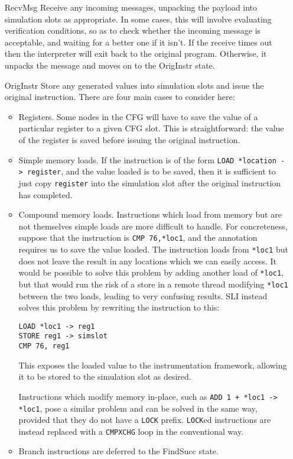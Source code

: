 \documentclass[12pt,a4paper]{book}
\begin{document}
\begin{itemize}
\item[RecvMsg]
  Receive any incoming messages, unpacking the payload into simulation slots as appropriate.
  In some cases, this will involve evaluating verification conditions, so as to check whether the incoming message is acceptable, and waiting for a better one if it isn't.
  If the receive times out then the interpreter will exit back to the original program.
  Otherwise, it unpacks the message and moves on to the OrigInstr state.
\item[OrigInstr]
  Store any generated values into simulation slots and issue the original instruction.
  There are four main cases to consider here:

  \begin{itemize}
  \item
    Registers.
    Some nodes in the CFG will have to save the value of a particular register to a given CFG slot.
    This is straightforward: the value of the register is saved before issuing the original instruction.
  \item
    Simple memory loads.
    If the instruction is of the form \verb|LOAD *location -> register|, and the value loaded is to be saved, then it is sufficient to just copy \verb|register| into the simulation slot after the original instruction has completed.
  \item
    Compound memory loads.
    Instructions which load from memory but are not themselves simple loads are more difficult to handle.
    For concreteness, suppose that the instruction is \verb|CMP 76,*loc1|, and the annotation requires us to save the value loaded.
    The instruction loads from \verb|*loc1| but does not leave the result in any locations which we can easily access.
    It would be possible to solve this problem by adding another load of \verb|*loc1|, but that would run the risk of a store in a remote thread modifying \verb|*loc1| between the two loads, leading to very confusing results.
    SLI instead solves this problem by rewriting the instruction to this:

\begin{verbatim}
LOAD *loc1 -> reg1
STORE reg1 -> simslot
CMP 76, reg1
\end{verbatim}

    This exposes the loaded value to the instrumentation framework, allowing it to be stored to the simulation slot as desired.

    Instructions which modify memory in-place, such as \verb|ADD 1 + *loc1 -> *loc1|, pose a similar problem and can be solved in the same way, provided that they do not have a \verb|LOCK| prefix.
    \verb|LOCK|ed instructions are instead replaced with a \verb|CMPXCHG| loop in the conventional way.
  \item
    Branch instructions are deferred to the FindSucc state.
  \end{itemize}
  

\end{itemize}
\end{document}
